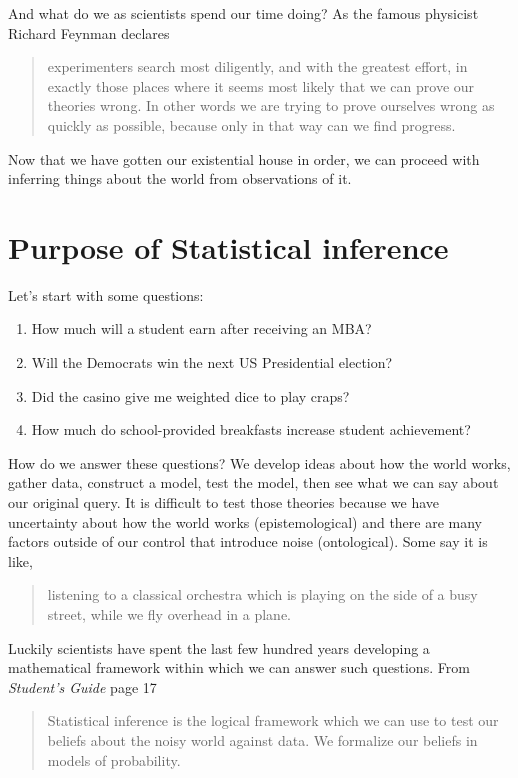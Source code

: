 \documentclass[]{article}
\begin{document}
And what do we as scientists spend our time doing? As the famous physicist Richard Feynman declares 
\begin{quote} 
experimenters search most diligently, and with the greatest effort, in exactly those places where it seems most likely that we can prove our theories wrong. In other words we are trying to prove ourselves wrong as quickly as possible, because only in that way can we find progress.
\end{quote}

Now that we have gotten our existential house in order, we can proceed
with inferring things about the world from observations of it.

\section{Purpose of Statistical inference}

Let's start with some questions: 
\begin{enumerate}
	\item How much will a student earn after receiving an MBA?
	\item Will the Democrats win the next US Presidential election? 
	\item Did the casino give me weighted dice to play craps? 
	\item How much do school-provided breakfasts increase student achievement?
\end{enumerate}

How do we answer these questions? We develop ideas about how the world works, gather data, construct a model, test the model, then see what we can say about our original query. It is difficult to test those theories because we have uncertainty about how the world works (epistemological) and there are many factors outside of our control that introduce noise (ontological). Some say it is like, 
\begin{quote}
listening to a classical orchestra which is playing on the side of a busy street, while we fly overhead in a plane.
\end{quote}

Luckily scientists have spent the last few hundred years developing a mathematical framework within which we can answer such questions. From \emph{Student's Guide} page 17 
\begin{quote}
Statistical inference is the logical framework which we can use to test our beliefs about the noisy world against data. We formalize our beliefs in models of probability.
\end{quote}
\end{document}
